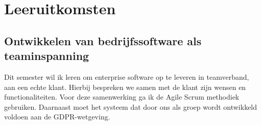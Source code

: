 \chapter{Leeruitkomsten}
\label{ch:learning_outcomes}







\section{Ontwikkelen van bedrijfssoftware als teaminspanning}\label{sec:ontwikkelen-van-bedrijfssoftware-als-teaminspanning}



Dit semester wil ik leren om enterprise software op te leveren in teamverband, aan een echte klant.
Hierbij bespreken we samen met de klant zijn wensen en functionaliteiten.
Voor deze samenwerking ga ik de Agile Scrum methodiek gebruiken.
Daarnaast moet het systeem dat door ons als groep wordt ontwikkeld voldoen aan de GDPR-wetgeving.


